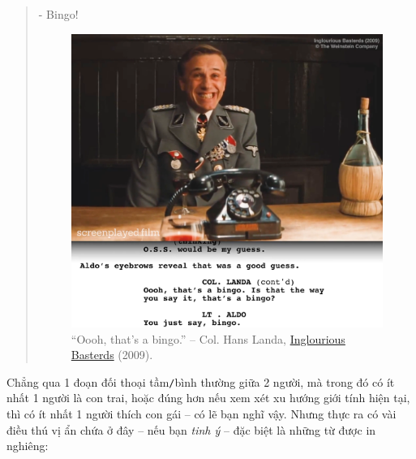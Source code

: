 \documentclass[12pt,twoside]{book}
\begin{document}
\begin{quotation}
	- Bingo!
	
	\begin{figure}[H]
		\centering
		\includegraphics[scale=0.3]{bingo}
		\caption{``Oooh, that's a bingo.'' -- Col. {\sf Hans Landa}, \href{https://www.imdb.com/title/tt0361748}{Inglourious Basterds} (2009).}
	\end{figure}
\end{quotation}
Chẳng qua 1 đoạn đối thoại tầm{\tt/}bình thường giữa 2 người, mà trong đó có ít nhất 1 người là con trai, hoặc đúng hơn nếu xem xét xu hướng giới tính hiện tại, thì có ít nhất 1 người thích con gái -- có lẽ bạn nghĩ vậy. Nhưng thực ra có vài điều thú vị ẩn chứa ở đây -- nếu bạn {\it tinh ý} -- đặc biệt là những từ được in nghiêng:
\end{document}

